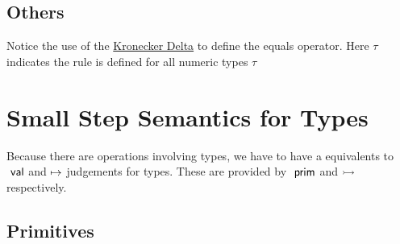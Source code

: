 \documentclass[acmsmall, review]{acmart}
\theoremstyle{definition}
\begin{document}
\subsection{Others}
Notice the use of the \href{https://en.wikipedia.org/wiki/Kronecker_delta}{Kronecker Delta} to define the equals operator. Here $\tau$ indicates the rule is defined for all numeric types $\tau$
{
    \centering
    \def \MathparLineskip {\lineskip=0.43cm}
}

\section{Small Step Semantics for Types}
Because there are operations involving types, we have to have a equivalents to $~\mathsf{val}$ and $\mapsto$ judgements for types. These are provided by $~\mathsf{prim}$ and $\rightarrowtail$ respectively.

\subsection{Primitives}
{
    \centering
    \def \MathparLineskip {\lineskip=0.43cm}
}
\end{document}
